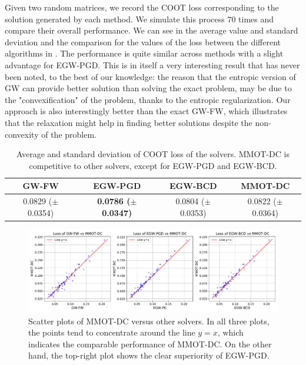 Given two random matrices, we record the COOT loss corresponding to the solution generated by each method.
We simulate this process $70$ times and compare their overall performance. We can see in  the average value and
standard deviation and the comparison for the values of the loss between the different algorithms in .
The performance is quite similar across methods with a  slight advantage for EGW-PGD. This is in itself a very
interesting result that has never been noted, to the best of our knowledge: the reason that the entropic version of GW can
provide better solution than solving the exact problem, may be due to the "convexification" of the problem, thanks to the entropic
regularization. Our approach is also interestingly better than the exact GW-FW, which illustrates that the relaxation might help in
finding better solutions despite the non-convexity of the problem.
\begin{table}[t]
  \begin{center}
    \begin{small}
      \begin{sc}
        \begin{tabular}{|c|c|c|c|}
          \hline
          GW-FW & EGW-PGD & EGW-BCD & MMOT-DC \\
          \hline
          0.0829 ($\pm$ 0.0354) & \textbf{0.0786 ($\pm$ 0.0347)} & 0.0804 ($\pm$ 0.0353) & 0.0822 ($\pm$ 0.0364) \\
          \hline
        \end{tabular}
      \end{sc}
    \end{small}
  \end{center}
  \caption{Average and standard deviation of COOT loss of the solvers. MMOT-DC is competitive to other solvers,
  except for EGW-PGD and EGW-BCD.
  \label{tab:gw}}
\end{table}

\begin{figure}[t]
	\centering
	\includegraphics[width=\textwidth,height=\textheight,keepaspectratio]{./Chapitre2/fig/all_vs_MMOT-DC.pdf}
	\caption{Scatter plots of MMOT-DC versus other solvers. In all three plots, the points tend to concentrate around the line $y=x$,
  which indicates the comparable performance of MMOT-DC. On the other hand, the top-right plot shows the clear superiority of EGW-PGD.}
	\label{fig:gw}
\end{figure}

